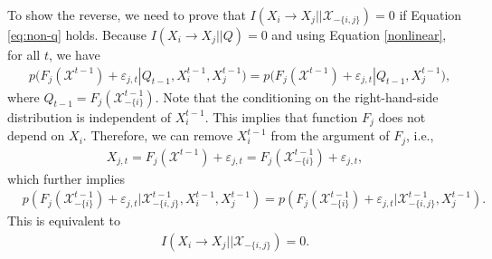 To show the reverse, we need to prove that $I(X_i\rightarrow X_j||\mathcal{X}_{-\{i,j\}})=0$ if Equation \eqref{eq:non-q} holds.
Because $I(X_i\rightarrow X_j||Q)=0$ and using Equation \eqref{nonlinear}, for all $t$, we have
\begin{align*}
    &p\big(F_{j}(\mathcal{X}^{t-1}) + \varepsilon_{j,t}|Q_{t-1}, X_i^{t-1},X_j^{t-1}\big)=
    p\big(F_{j}(\mathcal{X}^{t-1}) + \varepsilon_{j,t}|Q_{t-1}, X_j^{t-1}\big),
\end{align*}
where $Q_{t-1}=F_{j}(\mathcal{X}_{-\{i\}}^{t-1})$. Note that the conditioning on the right-hand-side distribution is independent of $X_{i}^{t-1}$. This implies that function $F_j$ does not depend on $X_i$. Therefore, we can remove $X_i^{t-1}$ from the argument of $F_j$, i.e., 
\begin{align*}
    X_{j,t}=F_{j}(\mathcal{X}^{t-1})+\varepsilon_{j,t}=F_{j}(\mathcal{X}_{-\{i\}}^{t-1})+\varepsilon_{j,t},
\end{align*} 
which further implies
\begin{align*}
    &p(F_{j}(\mathcal{X}_{-\{i\}}^{t-1}) + \varepsilon_{j,t}|\mathcal{X}_{-\{i,j\}}^{t-1}, X_i^{t-1},X_j^{t-1})=
    p(F_{j}(\mathcal{X}_{-\{i\}}^{t-1}) + \varepsilon_{j,t}|\mathcal{X}_{-\{i,j\}}^{t-1},X_j^{t-1}). 
\end{align*}
This is equivalent to 
\begin{align*}
    I(X_i\rightarrow X_j||\mathcal{X}_{-\{i,j\}})=0.
\end{align*}


